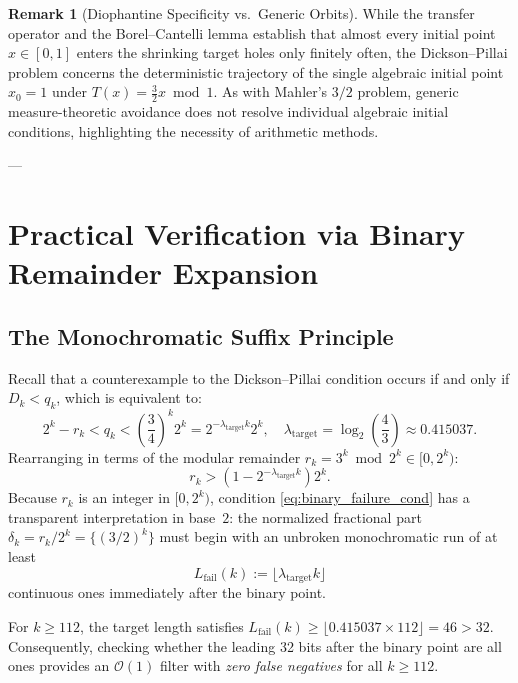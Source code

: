 \documentclass[11pt,reqno]{amsart}
\theoremstyle{definition}
\newtheorem{remark}[theorem]{Remark}
\numberwithin{equation}{section}
\begin{document}
\begin{remark}[Diophantine Specificity vs.\ Generic Orbits]
While the transfer operator and the Borel--Cantelli lemma establish that almost every initial point $x \in [0, 1]$ enters the shrinking target holes only finitely often, the Dickson--Pillai problem concerns the deterministic trajectory of the single algebraic initial point $x_0 = 1$ under $T(x) = \frac{3}{2} x \bmod 1$. As with Mahler's $3/2$ problem, generic measure-theoretic avoidance does not resolve individual algebraic initial conditions, highlighting the necessity of arithmetic methods.
\end{remark}

---

\section{Practical Verification via Binary Remainder Expansion}

\subsection{The Monochromatic Suffix Principle}
Recall that a counterexample to the Dickson--Pillai condition occurs if and only if $D_k < q_k$, which is equivalent to:
\begin{equation}
2^k - r_k < q_k < \left(\frac{3}{4}\right)^k 2^k = 2^{-\lambda_{\mathrm{target}} k} 2^k, \quad \lambda_{\mathrm{target}} = \log_2\left(\frac{4}{3}\right) \approx 0.415037.
\end{equation}
Rearranging in terms of the modular remainder $r_k = 3^k \bmod 2^k \in [0, 2^k)$:
\begin{equation}\label{eq:binary_failure_cond}
r_k > \left( 1 - 2^{-\lambda_{\mathrm{target}} k} \right) 2^k.
\end{equation}
Because $r_k$ is an integer in $[0, 2^k)$, condition \eqref{eq:binary_failure_cond} has a transparent interpretation in base~$2$:
the normalized fractional part $\delta_k = r_k / 2^k = \{(3/2)^k\}$ must begin with an unbroken monochromatic run of at least
\begin{equation}
L_{\mathrm{fail}}(k) := \lfloor \lambda_{\mathrm{target}} k \rfloor
\end{equation}
continuous ones immediately after the binary point.

For $k \ge 112$, the target length satisfies $L_{\mathrm{fail}}(k) \ge \lfloor 0.415037 \times 112 \rfloor = 46 > 32$. Consequently, checking whether the leading 32 bits after the binary point are all ones provides an $\mathcal{O}(1)$ filter with \emph{zero false negatives} for all $k \ge 112$.
\end{document}
